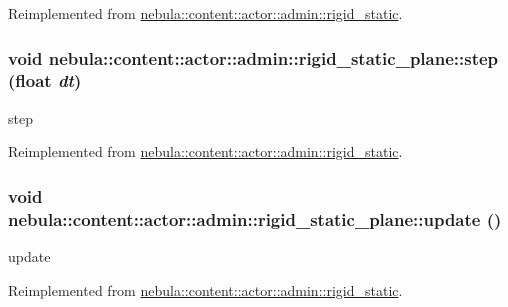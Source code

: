 Reimplemented from \hyperlink{classnebula_1_1content_1_1actor_1_1admin_1_1rigid__static_a813d55717971528046af12804e01ff4e}{nebula::content::actor::admin::rigid\_\-static}.\hypertarget{classnebula_1_1content_1_1actor_1_1admin_1_1rigid__static__plane_af1c2da35d02592bf5cad8823775bb2d7}{
\subsubsection[{step}]{\setlength{\rightskip}{0pt plus 5cm}void nebula::content::actor::admin::rigid\_\-static\_\-plane::step (float {\em dt})}}
\label{classnebula_1_1content_1_1actor_1_1admin_1_1rigid__static__plane_af1c2da35d02592bf5cad8823775bb2d7}


step 

Reimplemented from \hyperlink{classnebula_1_1content_1_1actor_1_1admin_1_1rigid__static_a6f209af8d75aa5159b4a2d75fcf2701a}{nebula::content::actor::admin::rigid\_\-static}.\hypertarget{classnebula_1_1content_1_1actor_1_1admin_1_1rigid__static__plane_ad14b9160b7c1aa9ae29d52141d1b6221}{
\subsubsection[{update}]{\setlength{\rightskip}{0pt plus 5cm}void nebula::content::actor::admin::rigid\_\-static\_\-plane::update ()}}
\label{classnebula_1_1content_1_1actor_1_1admin_1_1rigid__static__plane_ad14b9160b7c1aa9ae29d52141d1b6221}


update 

Reimplemented from \hyperlink{classnebula_1_1content_1_1actor_1_1admin_1_1rigid__static_af7ecdabc256260e8ae07436b3bc4854f}{nebula::content::actor::admin::rigid\_\-static}.

